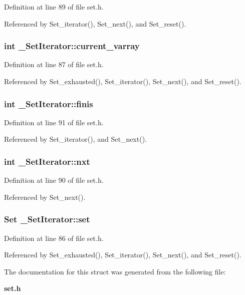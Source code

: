 Definition at line 89 of file set.h.

Referenced by Set\_\-iterator(), Set\_\-next(), and Set\_\-reset().
\subsubsection{\setlength{\rightskip}{0pt plus 5cm}int \bf{\_\-Set\-Iterator::current\_\-varray}}\label{struct__SetIterator_dba9a587d8e7bf41b783f89f633baa05}




Definition at line 87 of file set.h.

Referenced by Set\_\-exhausted(), Set\_\-iterator(), Set\_\-next(), and Set\_\-reset().
\subsubsection{\setlength{\rightskip}{0pt plus 5cm}int \bf{\_\-Set\-Iterator::finis}}\label{struct__SetIterator_865be277541a7d914a656b605aa5f15f}




Definition at line 91 of file set.h.

Referenced by Set\_\-iterator(), and Set\_\-next().
\subsubsection{\setlength{\rightskip}{0pt plus 5cm}int \bf{\_\-Set\-Iterator::nxt}}\label{struct__SetIterator_209be5196c1e8148432e5e26cb6c69fa}




Definition at line 90 of file set.h.

Referenced by Set\_\-next().
\subsubsection{\setlength{\rightskip}{0pt plus 5cm}\bf{Set} \bf{\_\-Set\-Iterator::set}}\label{struct__SetIterator_37b4b5a18209cbdca35e3fe7505bfaae}




Definition at line 86 of file set.h.

Referenced by Set\_\-exhausted(), Set\_\-iterator(), Set\_\-next(), and Set\_\-reset().

The documentation for this struct was generated from the following file:\begin{CompactItemize}
\item 
\bf{set.h}\end{CompactItemize}
